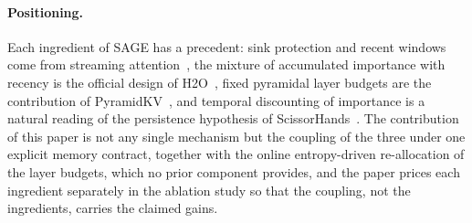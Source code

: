 \paragraph{Positioning.}
Each ingredient of SAGE has a precedent: sink protection and recent
windows come from streaming attention~\cite{xiao2023efficient}, the
mixture of accumulated importance with recency is the official design
of H2O~\cite{zhang2023h2o}, fixed pyramidal layer budgets are the
contribution of PyramidKV~\cite{zhang2024pyramidkv}, and temporal
discounting of importance is a natural reading of the persistence
hypothesis of ScissorHands~\cite{liu2023scissorhands}. The contribution
of this paper is not any single mechanism but the coupling of the
three under one explicit memory contract, together with the online
entropy-driven re-allocation of the layer budgets, which no prior
component provides, and the paper prices each ingredient separately in
the ablation study so that the coupling, not the ingredients, carries
the claimed gains.
